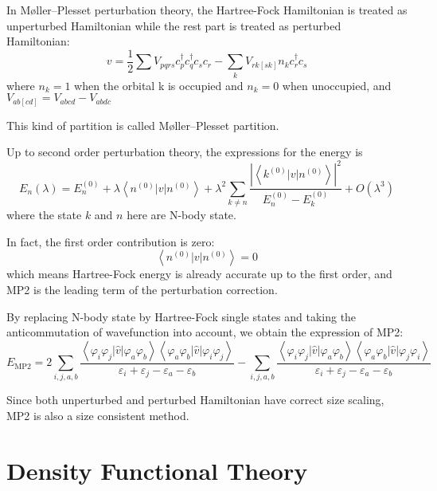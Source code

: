 In M{\o}ller–Plesset perturbation theory, the Hartree-Fock Hamiltonian is treated as unperturbed Hamiltonian while the rest part is treated as perturbed Hamiltonian:
\begin{equation}
v=\frac{1}{2} \sum V_{p q r s} c_{p}^{\dagger} c_{q}^{\dagger} c_{s} c_{r}-\sum_{k} V_{r k[s k]} n_{k} c_{r}^{\dagger} c_{s}
\end{equation}
where $n_k=1$ when the orbital k is occupied and $n_k=0$ when unoccupied, and $V_{ab[cd]}=V_{abcd}-V_{abdc}$

This kind of partition is called M{\o}ller–Plesset partition.

Up to second order perturbation theory, the expressions for the energy is
\begin{equation}
E_{n}(\lambda)=E_{n}^{(0)}+\lambda\left\langle n^{(0)}|v| n^{(0)}\right\rangle+\lambda^{2} \sum_{k \neq n} \frac{\left|\left\langle k^{(0)}|v| n^{(0)}\right\rangle\right|^{2}}{E_{n}^{(0)}-E_{k}^{(0)}}+O\left(\lambda^{3}\right)
\end{equation}
where the state $k$ and $n$ here are N-body state.

In fact, the first order contribution is zero:
\begin{equation}
\left\langle n^{(0)}|v| n^{(0)}\right\rangle=0
\end{equation}
which means Hartree-Fock energy is already accurate up to the first order, and MP2 is the leading term of the perturbation correction.

By replacing N-body state by Hartree-Fock single states and taking the anticommutation of wavefunction into account, we obtain the expression of MP2:
\begin{equation}
E_{\mathrm{MP} 2}=2 \sum_{i, j, a, b} \frac{\left\langle\varphi_{i} \varphi_{j}|\hat{v}| \varphi_{a} \varphi_{b}\right\rangle\left\langle\varphi_{a} \varphi_{b}|\hat{v}| \varphi_{i} \varphi_{j}\right\rangle}{\varepsilon_{i}+\varepsilon_{j}-\varepsilon_{a}-\varepsilon_{b}}-\sum_{i, j, a, b} \frac{\left\langle\varphi_{i} \varphi_{j}|\hat{v}| \varphi_{a} \varphi_{b}\right\rangle\left\langle\varphi_{a} \varphi_{b}|\hat{v}| \varphi_{j} \varphi_{i}\right\rangle}{\varepsilon_{i}+\varepsilon_{j}-\varepsilon_{a}-\varepsilon_{b}}
\end{equation}

Since both unperturbed and perturbed Hamiltonian have correct size scaling, MP2 is also a size consistent method.

\section{Density Functional Theory}


